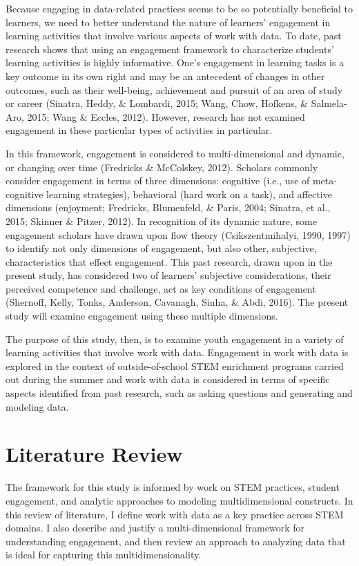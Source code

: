 \documentclass[]{msu-thesis}
\theoremstyle{definition}
\theoremstyle{definition}
\theoremstyle{definition}
\theoremstyle{remark}
\begin{document}
Because engaging in data-related practices seems to be so potentially
beneficial to learners, we need to better understand the nature of
learners' engagement in learning activities that involve various aspects
of work with data. To date, past research shows that using an engagement
framework to characterize students' learning activities is highly
informative. One's engagement in learning tasks is a key outcome in its
own right and may be an antecedent of changes in other outcomes, such as
their well-being, achievement and pursuit of an area of study or career
(Sinatra, Heddy, \& Lombardi, 2015; Wang, Chow, Hofkens, \& Salmela-Aro,
2015; Wang \& Eccles, 2012). However, research has not examined
engagement in these particular types of activities in particular.

In this framework, engagement is considered to multi-dimensional and
dynamic, or changing over time (Fredricks \& McColskey, 2012). Scholars
commonly consider engagement in terms of three dimensions: cognitive
(i.e., use of meta-cognitive learning strategies), behavioral (hard work
on a task), and affective dimensions (enjoyment; Fredricks, Blumenfeld,
\& Paris, 2004; Sinatra, et al., 2015; Skinner \& Pitzer, 2012). In
recognition of its dynamic nature, some engagement scholars have drawn
upon flow theory (Csikszentmihalyi, 1990, 1997) to identify not only
dimensions of engagement, but also other, subjective, characteristics
that effect engagement. This past research, drawn upon in the present
study, has considered two of learners' subjective considerations, their
perceived competence and challenge, act as key conditions of engagement
(Shernoff, Kelly, Tonks, Anderson, Cavanagh, Sinha, \& Abdi, 2016). The
present study will examine engagement using these multiple dimensions.

The purpose of this study, then, is to examine youth engagement in a
variety of learning activities that involve work with data. Engagement
in work with data is explored in the context of outside-of-school STEM
enrichment programs carried out during the summer and work with data is
considered in terms of specific aspects identified from past research,
such as asking questions and generating and modeling data.

\chapter{Literature Review}\label{literature-review}

The framework for this study is informed by work on STEM practices,
student engagement, and analytic approaches to modeling multidimensional
constructs. In this review of literature, I define work with data as a
key practice across STEM domains. I also describe and justify a
multi-dimensional framework for understanding engagement, and then
review an approach to analyzing data that is ideal for capturing this
multidimensionality.
\end{document}
